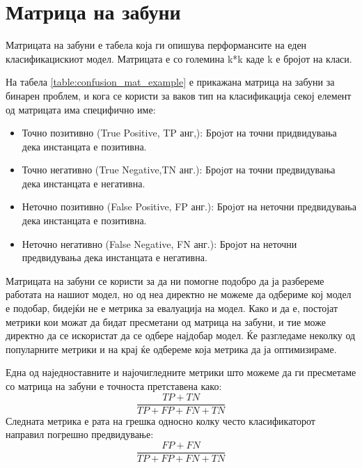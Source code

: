 \section{Матрица на забуни}
Матрицата на забуни е табела која ги опишува перформансите на еден класификацискиот модел. Матрицата е со големина k*k каде k е бројот на класи. 
\begin{table}[H]
 \centering
\caption{Пример на матрица на забуни}
\label{table:confusion_mat_example}
\end{table}

На табела \ref{table:confusion_mat_example} е прикажана матрица на забуни за бинарен проблем, и кога се користи за ваков тип на класификација секој елемент од матрицата има специфично име:
\begin{itemize}
  \item Точно позитивно (True Positive, TP анг,): Броjот на точни придвидувања дека инстанцата е позитивна.
  \item Точно негативно (True Negative,TN анг.): Броjот на точни предвидувања дека инстанцата е негативна.
 \item Неточно позитивно (False Positive, FP анг.): Броjот на неточни предвидувања дека инстанцата е позитивна.
 \item Неточно негативно (False Negative, FN анг.): Броjот на неточни предвидувања дека инстанцата е негативна.
\end{itemize}
Матрицата на забуни се користи за да ни помогне подобро да ја разбереме работата на нашиот модел, но од неа директно не можеме да одбериме кој модел е подобар, бидејќи не е метрика за евалуација на модел. Како и да е, постојат метрики кои можат да бидат пресметани од матрица на забуни, и тие може директно да се искористат да се одбере најдобар модел. Ќе разгледаме неколку од популарните метрики и на крај ќе одбереме која метрика да ја оптимизираме.

Една од наједноставните и најочигледните метрики што можеме да ги пресметаме со матрица на забуни е точноста претставена како:
\begin{equation}
\frac{TP + TN}{TP + FP + FN + TN}
\end{equation}
Следната метрика е рата на грешка односно колку често класификаторот направил погрешно предвидување:
\begin{equation}
\frac{FP + FN}{TP + FP + FN + TN}
\end{equation}

